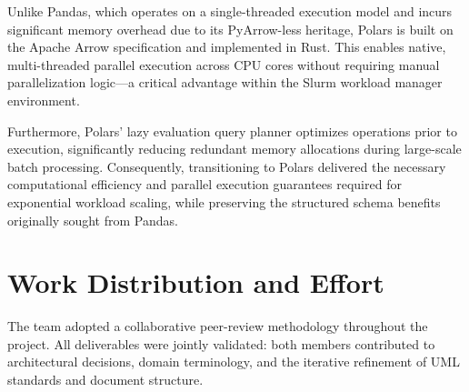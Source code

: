 \documentclass[11pt, a4paper]{article}
\begin{document}
\begin{itemize}
    Unlike Pandas, which operates on a single-threaded execution model and incurs significant memory overhead due to its PyArrow-less heritage, Polars is built on the Apache Arrow specification and implemented in Rust. This enables native, multi-threaded parallel execution across CPU cores without requiring manual parallelization logic—a critical advantage within the Slurm workload manager environment.

    Furthermore, Polars' lazy evaluation query planner optimizes operations prior to execution, significantly reducing redundant memory allocations during large-scale batch processing. Consequently, transitioning to Polars delivered the necessary computational efficiency and parallel execution guarantees required for exponential workload scaling, while preserving the structured schema benefits originally sought from Pandas.
\end{itemize}


\newpage

\section{Work Distribution and Effort}
\vspace{0.3cm}
\noindent
The team adopted a collaborative peer-review methodology throughout the project. All deliverables were jointly validated: both members contributed to architectural decisions, domain terminology, and the iterative refinement of UML standards and document structure.
\end{document}

